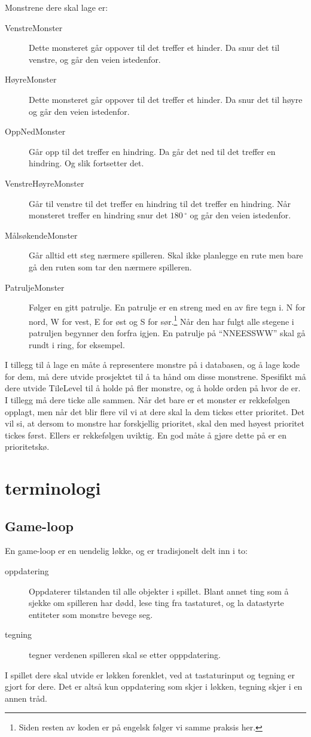 \documentclass[norsk]{article}
\begin{document}
Monstrene dere skal lage er:
\begin{description}
\item [VenstreMonster] Dette monsteret går oppover til det treffer et hinder. Da snur det til venstre, og går den veien istedenfor.
\item [HøyreMonster] Dette monsteret går oppover til det treffer et hinder. Da snur det til høyre og går den veien istedenfor.
\item [OppNedMonster] Går opp til det treffer en hindring. Da går det ned til det treffer en hindring. Og slik fortsetter det.
\item [VenstreHøyreMonster] Går til venstre til det treffer en hindring til det treffer en hindring. Når monsteret treffer en hindring snur det $180\,^{\circ}$ og går den veien istedenfor.
\item [MålsøkendeMonster] Går alltid ett steg nærmere spilleren. Skal ikke planlegge en rute men bare gå den ruten som tar den nærmere spilleren.
\item [PatruljeMonster] Følger en gitt patrulje. En patrulje er en streng med en av fire tegn i. N for nord, W for vest, E for øst og S for sør.\footnote{Siden resten av koden er på engelsk følger vi samme praksis her.} Når den har fulgt alle stegene i patruljen begynner den forfra igjen. En patrulje på ``NNEESSWW'' skal gå rundt i ring, for eksempel.
\end{description}

I tillegg til å lage en måte å representere monstre på i databasen, og å lage kode for dem, må dere utvide prosjektet til å ta hånd om disse monstrene.
Spesifikt må dere utvide TileLevel til å holde på fler monstre, og å holde orden på hvor de er.
I tillegg må dere ticke alle sammen. Når det bare er et monster er rekkefølgen  opplagt, men når det blir flere vil vi at dere skal la dem tickes etter prioritet.
Det vil si, at dersom to monstre har forskjellig prioritet, skal den med høyest prioritet tickes først. Ellers er rekkefølgen uviktig.
En god måte å gjøre dette på er en prioritetskø.

\section{terminologi}
\subsection{Game-loop}
\label{subsec:game-loop}
En game-loop er en uendelig løkke, og er tradisjonelt delt inn i to:
\begin{description}
\item [oppdatering] Oppdaterer tilstanden til alle objekter i spillet. Blant annet ting som å sjekke om spilleren har dødd, lese ting fra tastaturet, og la datastyrte entiteter som monstre bevege seg.
\item [tegning] tegner verdenen spilleren skal se etter opppdatering.
\end{description}
I spillet dere skal utvide er løkken forenklet, ved at tastaturinput og tegning er gjort for dere.
Det er altså kun oppdatering som skjer i løkken, tegning skjer i en annen tråd.
\end{document}
